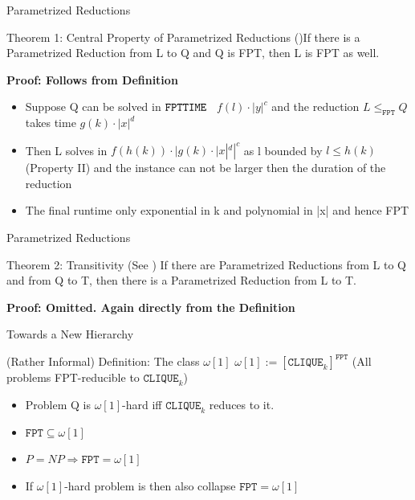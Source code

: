 \begin{frame}[c]{Parametrized Reductions}
\begin{center}
\begin{block}{Theorem 1: Central Property of Parametrized Reductions (\cite[Th. 13.2]{Cygan2015})}{If there is a Parametrized Reduction from L to Q and Q is FPT, then L is FPT as well. }
\end{block}
\end{center}
\textbf{Proof: Follows from Definition} 
\begin{itemize}
    \pause\item Suppose Q can be solved in $\mathtt{FPT\-TIME}$~ $f(l) \cdot |y|^c$ and the reduction $L \leq_{\mathtt{FPT}} Q$ takes time $g(k) \cdot |x|^d$
    \pause\item Then L solves in $f(h(k)) \cdot |g(k) \cdot |x|^d|^c$ as  l bounded by $l \leq h(k)$ (Property II) and the instance can not be larger then the duration of the reduction
    \item The final runtime only exponential in k and polynomial in |x| and hence FPT \QEDA
    \end{itemize}
\end{frame}

\begin{frame}[c]{Parametrized Reductions}
\begin{center}
\begin{block}{Theorem 2: Transitivity (See \cite[Th. 13.3]{Cygan2015})}
If there are Parametrized Reductions from  L to Q and from Q to T, then there is a Parametrized Reduction from L to T.
\end{block}
    \textbf{Proof: Omitted. Again directly from the Definition}
\end{center}
\end{frame}

\begin{frame}[c]{Towards a New Hierarchy}
\begin{center}
\begin{block}{(Rather Informal) Definition: The class $\omega[1]$}
$\omega[1] := [\mathtt{CLIQUE}_k]^{\mathtt{FPT}}$ (All problems FPT-reducible to $\mathtt{CLIQUE}_k$)
\end{block}
\begin{itemize}
    \pause\item Problem Q is $\omega[1]$-hard iff $\mathtt{CLIQUE}_k$ reduces to it.
    \pause\item $\mathtt{FPT} \subseteq \omega[1]$
    \pause\item $P = NP \Rightarrow \mathtt{FPT} = \omega[1]$
    \pause\item If $\omega[1]$-hard problem is  then also collapse $\mathtt{FPT} =  \omega[1]$
\end{itemize}
\end{center}
\end{frame}

